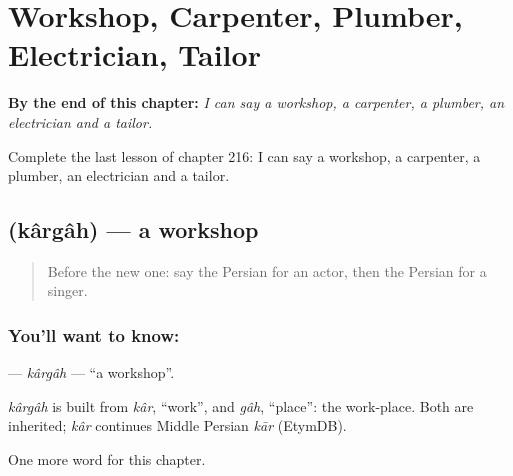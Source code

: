 
\chapter{Workshop, Carpenter, Plumber, Electrician, Tailor}
\label{ch:fa-workshop-carpenter-plumber-electrician-tailor}

\begin{chapteropening}
\textbf{By the end of this chapter:} \emph{I can say a workshop, a carpenter, a plumber, an electrician and a tailor.}

Complete the last lesson of chapter 216: I can say a workshop, a carpenter, a plumber, an electrician and a tailor.
\end{chapteropening}

\section[\texorpdfstring{\fa{کارگاه} (kârgâh)}{کارگاه (kârgâh)}]{ (kârgâh) — a workshop}

\label{lesson:FA-C216-kargah}



\begin{quote}
Before the new one: say the Persian for an actor, then the Persian for a singer.
\end{quote}

\subsection*{You'll want to know: }
\textbf{} — \emph{kârgâh} — \textquotedblleft{}a workshop\textquotedblright{}.

\begin{cousinweb}
\emph{kârgâh} is built from \emph{kâr}, \textquotedblleft{}work\textquotedblright{}, and \emph{gâh}, \textquotedblleft{}place\textquotedblright{}: the work-place. Both are inherited; \emph{kâr} continues Middle Persian \emph{kār} (EtymDB).
\end{cousinweb}

\begin{grammarlens}[title={What you've built}]
One more word for this chapter.
\end{grammarlens}

